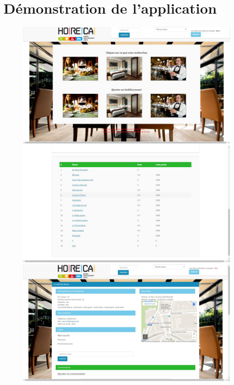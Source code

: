 \section{Démonstration de l'application}
\begin{figure}[h!]
   \begin{minipage}[b]{0.37\linewidth}
      \centering \includegraphics[scale=0.15]{pagegarde}
   \end{minipage}\hfill
   \begin{minipage}[b]{0.37\linewidth}   
      \centering \includegraphics[scale=0.15]{liste}
   \end{minipage}
   \begin{minipage}[b]{0.35\linewidth}
      \centering \includegraphics[scale=0.15]{pres}

\end{minipage}
\end{figure}
